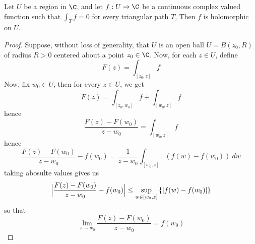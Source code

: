 \begin{theorem}\label{4.5.7}
    Let $U$ be a region in $\C$, and let  $f:U \xrightarrow{} \C$ be a continuous
    complex valued function such that $\int_T{f}=0$ for every triangular path
    $T$, Then  $f$ is holomorphic on $U$.
\end{theorem}
\begin{proof}
    Suppose, without loss of generality, that $U$ is an open ball  $U=B(z_0,R)$
    of radius $R>0$ centered about a point $z_0 \in \C$. Now, for each $z \in
    U$, define
    \begin{equation*}
        F(z)=\int_{[z_0,z]}{f}
    \end{equation*}
    Now, fix $w_0 \in U$, then for every $z \in U$, we get
    \begin{equation*}
        F(z)=\int_{[z_0,w_0]}{f}+\int_{[w_0,z]}{f}
    \end{equation*}
    hence
    \begin{equation*}
        \frac{F(z)-F(w_0)}{z-w_0}=\int_{[w_0,z]}{f}
    \end{equation*}
    hence
    \begin{equation*}
        \frac{F(z)-F(w_0)}{z-w_0}-f(w_0)=
        \frac{1}{z-w_0}\int_{[w_0,z]}{(f(w)-f(w_0)) \ dw}
    \end{equation*}
    taking abosulte values gives us
    \begin{equation*}
        \Big{|}\frac{F(z)-F(w_0)}{z-w_0}-f(w_0)\Big{|} \leq
        \sup_{w \in [w_0,z]}{\{|f(w)-f(w_0)|\}}
    \end{equation*}
    so that
    \begin{equation*}
        \lim_{z \xrightarrow{} w_0}{\frac{F(z)-F(w_0)}{z-w_0}}=f(w_0)
    \end{equation*}
\end{proof}
